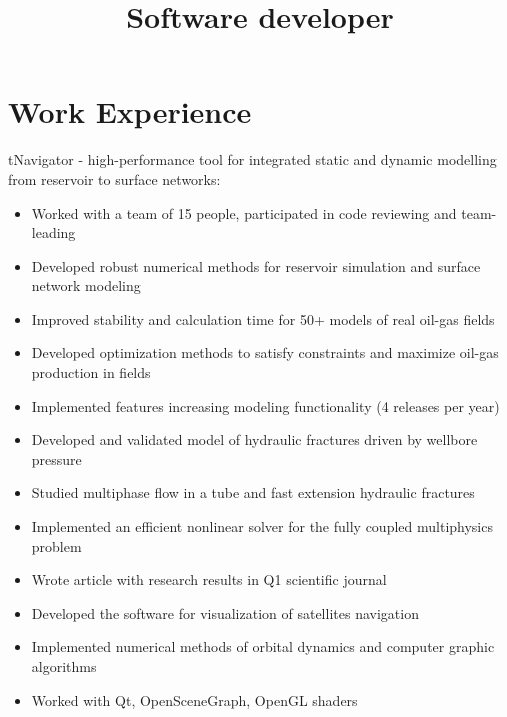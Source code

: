 \documentclass[10pt,a4paper]{moderncv}
\title{Software developer}
\begin{document}
\maketitle

\section{Work Experience}

{tNavigator - high-performance tool for integrated static and dynamic modelling from reservoir to surface networks:
  \begin{itemize}
  \item Worked with a team of 15 people, participated in code reviewing and team-leading
  \item Developed robust numerical methods for reservoir simulation and surface network modeling
  \item Improved stability and calculation time for 50+ models of real oil-gas fields
  \item Developed optimization methods to satisfy constraints and maximize oil-gas production in fields
  \item Implemented features increasing modeling functionality (4 releases per year)
  \end{itemize}
}

{
\begin{itemize}
 \item Developed and validated model of hydraulic fractures driven by wellbore pressure
 \item Studied multiphase flow in a tube and fast extension hydraulic fractures 
 \item Implemented an efficient nonlinear solver for the fully coupled multiphysics problem
 \item Wrote article with research results in Q1 scientific journal 
\end{itemize}
}

{
\begin{itemize}
 \item Developed the software for visualization of satellites navigation
 \item Implemented numerical methods of orbital dynamics and computer graphic algorithms
 \item Worked with Qt, OpenSceneGraph, OpenGL shaders
\end{itemize}
}
\end{document}
